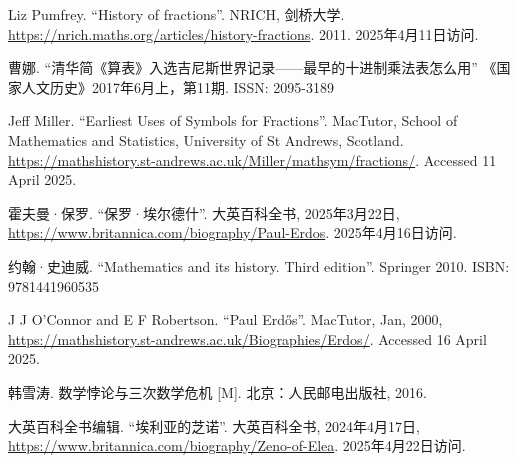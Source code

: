 Liz Pumfrey. ``History of fractions''. NRICH, 剑桥大学. \url{https://nrich.maths.org/articles/history-fractions}. 2011. 2025年4月11日访问.


曹娜. ``清华简《算表》入选吉尼斯世界记录——最早的十进制乘法表怎么用'' 《国家人文历史》2017年6月上，第11期. ISSN: 2095-3189

Jeff Miller. ``Earliest Uses of Symbols for Fractions''. MacTutor, School of Mathematics and Statistics, University of St Andrews, Scotland. \url{https://mathshistory.st-andrews.ac.uk/Miller/mathsym/fractions/}. Accessed 11 April 2025.

霍夫曼·保罗. ``保罗·埃尔德什''. 大英百科全书, 2025年3月22日, \url{https://www.britannica.com/biography/Paul-Erdos}. 2025年4月16日访问.

约翰·史迪威. ``Mathematics and its history. Third edition''. Springer 2010. ISBN: 9781441960535


J J O'Connor and E F Robertson. ``Paul Erdős''. MacTutor, Jan, 2000, \url{https://mathshistory.st-andrews.ac.uk/Biographies/Erdos/}. Accessed 16 April 2025.

韩雪涛. 数学悖论与三次数学危机 [M]. 北京：人民邮电出版社, 2016. %

大英百科全书编辑. ``埃利亚的芝诺''. 大英百科全书, 2024年4月17日, \url{https://www.britannica.com/biography/Zeno-of-Elea}. 2025年4月22日访问.

